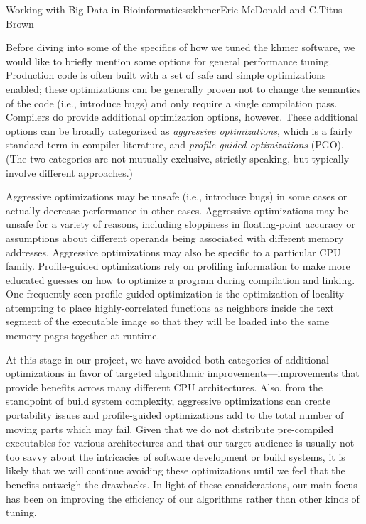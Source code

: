 \begin{aosachapter}{Working with Big Data in Bioinformatics}{s:khmer}{Eric McDonald and C.\/Titus Brown}

Before diving into some of the specifics of how we tuned the khmer
software, we would like to briefly mention some options for general
performance tuning. Production code is often built with a set of safe
and simple optimizations enabled; these optimizations can be generally
proven not to change the semantics of the code (i.e., introduce bugs)
and only require a single compilation pass. Compilers do provide
additional optimization options, however. These additional options can
be broadly categorized as \emph{aggressive optimizations}, which is a
fairly standard term in compiler literature, and \emph{profile-guided
optimizations} (PGO)\cite{web:PGO}. (The two categories are not
mutually-exclusive, strictly speaking, but typically involve different
approaches.)

Aggressive optimizations may be unsafe (i.e., introduce bugs) in some
cases or actually decrease performance in other cases. Aggressive
optimizations may be unsafe for a variety of reasons, including
sloppiness in floating-point accuracy or assumptions about different
operands being associated with different memory addresses. Aggressive
optimizations may also be specific to a particular CPU family.
Profile-guided optimizations rely on profiling information to make more
educated guesses on how to optimize a program during compilation and
linking. One frequently-seen profile-guided optimization is the
optimization of locality---attempting to place highly-correlated
functions as neighbors inside the text segment of the executable image
so that they will be loaded into the same memory pages together at
runtime.

At this stage in our project, we have avoided both categories of
additional optimizations in favor of targeted algorithmic
improvements---improvements that provide benefits across many different
CPU architectures. Also, from the standpoint of build system complexity,
aggressive optimizations can create portability issues and
profile-guided optimizations add to the total number of moving parts
which may fail. Given that we do not distribute pre-compiled executables
for various architectures and that our target audience is usually not
too savvy about the intricacies of software development or build
systems, it is likely that we will continue avoiding these optimizations
until we feel that the benefits outweigh the drawbacks. In light of
these considerations, our main focus has been on improving the
efficiency of our algorithms rather than other kinds of tuning.


\end{aosachapter}
